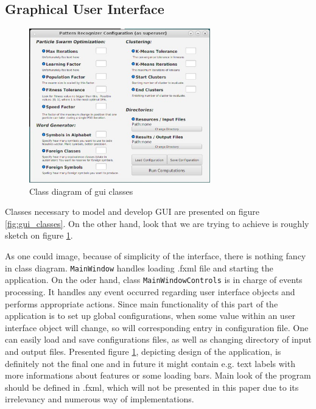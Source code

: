 \documentclass{article}
\begin{document}
%
%
\newpage
\subsection{Graphical User Interface}
\begin{figure}
  \begin{center}
    \includegraphics[width=0.7\textwidth]{images/mock_gui.jpg}
  \end{center}
  \caption{Class diagram of gui classes}
  \label{fig:gui_look}
\end{figure}

Classes necessary to model and develop GUI are presented on figure \ref{fig:gui_classes}. On the other hand, look that we are trying to achieve is roughly sketch on figure \ref{fig:gui_look}.

As one could image, because of simplicity of the interface, there is nothing fancy in class diagram. \texttt{MainWindow} handles loading .fxml file and starting the application. On the oder hand, class \texttt{MainWindowControls} is in charge of events processing. It handles any event occurred regarding user interface objects and performs appropriate actions. Since main functionality of this part of the application is to set up global configurations, when some value within an user interface object will change, so will corresponding entry in configuration file. One can easily load and save configurations files, as well as changing directory of input and output files. Presented figure \ref{fig:gui_look}, depicting design of the application, is definitely not the final one and in future it might contain e.g. text labels with more informations about features or some loading bars. Main look of the program should be defined in .fxml, which will not be presented in this paper due to its irrelevancy and numerous way of implementations. 
\end{document}
